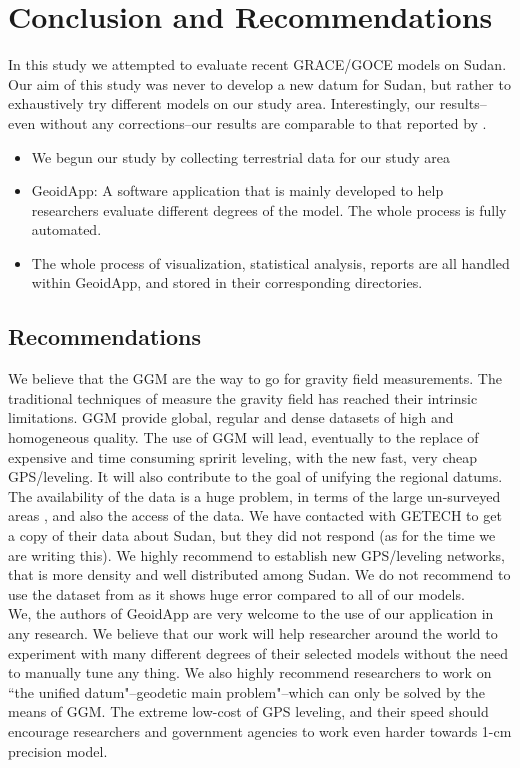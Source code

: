 \chapter{Conclusion and Recommendations}
\label{Chapter6}
In this study we attempted to evaluate recent GRACE/GOCE models on Sudan. Our aim of this study was never to develop a new datum for Sudan, but rather to exhaustively try different models on our study area. Interestingly, our results--even without any corrections--our results are comparable to that reported by \citep{ahmed_msc, godah}. 

\begin{itemize}
	\item We begun our study by collecting terrestrial data for our study area
	\item GeoidApp: A software application that is mainly developed to help researchers evaluate different degrees of the model. The whole process is fully automated.
	\item The whole process of visualization, statistical analysis, reports are all handled within GeoidApp, and stored in their corresponding directories.
\end{itemize}

\section{Recommendations}

We believe that the GGM are the way to go for gravity field measurements. The traditional techniques of measure the gravity field has reached their intrinsic limitations. GGM provide global, regular and dense datasets of high and homogeneous quality. The use of GGM will lead, eventually to the replace of expensive and time consuming spririt leveling, with the new fast, very cheap GPS/leveling. It will also contribute to the goal of unifying the regional datums.
\\
The availability of the data is a huge problem, in terms of the large un-surveyed areas \citep{ahmed_msc, godah}, and also the access of the data. We have contacted with GETECH to get a copy of their data about Sudan, but they did not respond (as for the time we are writing this). We highly recommend to establish new GPS/leveling networks, that is more density and well distributed among Sudan. We do not recommend to use the dataset from \citep{osman} as it shows huge error compared to all of our models. 
\\
We, the authors of GeoidApp are very welcome to the use of our application in any research. We believe that our work will help researcher around the world to experiment with many different degrees of their selected models without the need to manually tune any thing. We also highly recommend researchers to work on ``the unified datum"--geodetic main problem"--which can only be solved by the means of GGM. The extreme low-cost of GPS leveling, and their speed should encourage researchers and government agencies to work even harder towards 1-cm precision model. 